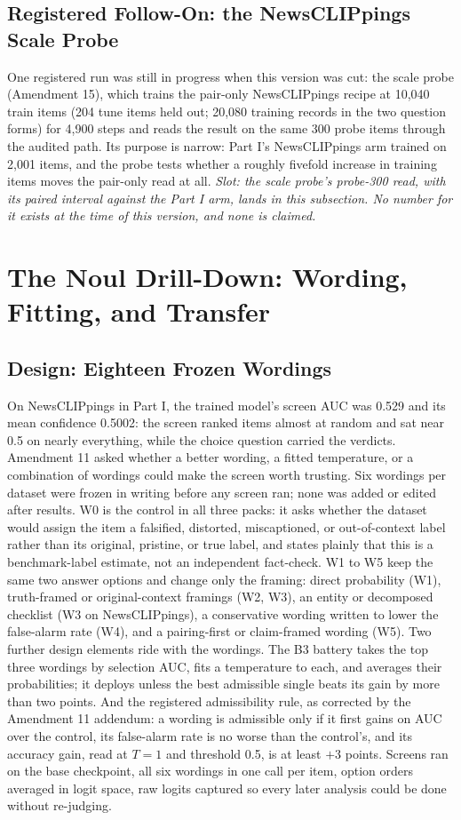 \documentclass{article} %
\begin{document}
\subsection{Registered Follow-On: the NewsCLIPpings Scale Probe}
One registered run was still in progress when this version was cut: the scale probe (Amendment 15), which trains the pair-only NewsCLIPpings recipe at 10,040 train items (204 tune items held out; 20,080 training records in the two question forms) for 4,900 steps and reads the result on the same 300 probe items through the audited path. Its purpose is narrow: Part I's NewsCLIPpings arm trained on 2,001 items, and the probe tests whether a roughly fivefold increase in training items moves the pair-only read at all. \textit{Slot: the scale probe's probe-300 read, with its paired interval against the Part I arm, lands in this subsection. No number for it exists at the time of this version, and none is claimed.}


\section{The Noul Drill-Down: Wording, Fitting, and Transfer}
\label{sec:noul}
\subsection{Design: Eighteen Frozen Wordings}
On NewsCLIPpings in Part I, the trained model's screen AUC was 0.529 and its mean confidence 0.5002: the screen ranked items almost at random and sat near 0.5 on nearly everything, while the choice question carried the verdicts. Amendment 11 asked whether a better wording, a fitted temperature, or a combination of wordings could make the screen worth trusting. Six wordings per dataset were frozen in writing before any screen ran; none was added or edited after results. W0 is the control in all three packs: it asks whether the dataset would assign the item a falsified, distorted, miscaptioned, or out-of-context label rather than its original, pristine, or true label, and states plainly that this is a benchmark-label estimate, not an independent fact-check. W1 to W5 keep the same two answer options and change only the framing: direct probability (W1), truth-framed or original-context framings (W2, W3), an entity or decomposed checklist (W3 on NewsCLIPpings), a conservative wording written to lower the false-alarm rate (W4), and a pairing-first or claim-framed wording (W5). Two further design elements ride with the wordings. The B3 battery takes the top three wordings by selection AUC, fits a temperature to each, and averages their probabilities; it deploys unless the best admissible single beats its gain by more than two points. And the registered admissibility rule, as corrected by the Amendment 11 addendum: a wording is admissible only if it first gains on AUC over the control, its false-alarm rate is no worse than the control's, and its accuracy gain, read at \(T=1\) and threshold 0.5, is at least \(+3\) points. Screens ran on the base checkpoint, all six wordings in one call per item, option orders averaged in logit space, raw logits captured so every later analysis could be done without re-judging.
\end{document}

